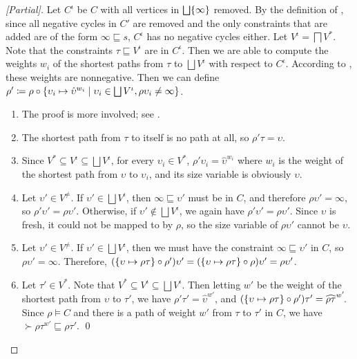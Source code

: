 \begin{proof}[{[Partial]}]
Let $C^\iota$ be $C$ with all vertices in $\bigsqcup \{\infty\}$ removed.
By the definition of \RecCheck, since all negative cycles in $C'$ are removed and the only constraints that are added are of the form $\infty \sqsubseteq s$,
$C^\iota$ has no negative cycles either.
Let $V^\iota = \bigsqcap V^*$.
Note that the constraints $\tau \sqsubseteq V^\iota$ are in $C^\iota$.
Then we are able to compute the weights $w_i$ of the shortest paths from $\tau$ to $\bigsqcup V^\iota$ with respect to $C^\iota$.
According to \citet{f-hat}, these weights are nonnegative.
Then we can define $\rho' \coloneqq \rho \circ \{\upsilon_i \mapsto \hat{\upsilon}^{w_i} \mid \upsilon_i \in \bigsqcup V^\iota, \rho\upsilon_i \neq \infty\}$.

\begin{enumerate}
  \item The proof is more involved; see \citet{f-hat}.
  \item The shortest path from $\tau$ to itself is no path at all, so $\rho'\tau = \upsilon$.
  \item Since $V^* \subseteq V^\iota \subseteq \bigsqcup V^\iota$,
    for every $\upsilon_i \in V^*$, $\rho'\upsilon_i = \hat{\upsilon}^{w_i}$ where $w_i$ is the weight of the shortest path from $\upsilon$ to $\upsilon_i$,
    and its size variable is obviously $\upsilon$.
  \item Let $\upsilon' \in V^\neq$.
    If $\upsilon' \in \bigsqcup V^\iota$, then $\infty \sqsubseteq \upsilon'$ must be in $C$, and therefore $\rho\upsilon' = \infty$, so $\rho'\upsilon' = \rho\upsilon'$.
    Otherwise, if $\upsilon' \notin \bigsqcup V^\iota$, we again have $\rho'\upsilon' = \rho\upsilon'$.
    Since $\upsilon$ is fresh, it could not be mapped to by $\rho$, so the size variable of $\rho\upsilon'$ cannot be $\upsilon$.
  \item Let $\upsilon' \in V^\neq$.
    If $\upsilon' \in \bigsqcup V^\iota$,
    then we must have the constraint $\infty \sqsubseteq \upsilon'$ in $C$, so $\rho\upsilon' = \infty$.
    Therefore, $(\{\upsilon \mapsto \rho\tau\} \circ \rho')\upsilon' = (\{\upsilon \mapsto \rho\tau\} \circ \rho)\upsilon' = \rho\upsilon'$.
  \item Let $\tau' \in V^*$. Note that $V^* \subseteq V^\iota \subseteq \bigsqcup V^\iota$.
    Then letting $w'$ be the weight of the shortest path from $\upsilon$ to $\tau'$, we have $\rho'\tau' = \hat{\upsilon}^{w'}$,
    and $(\{\upsilon \mapsto \rho\tau\} \circ \rho')\tau' = \widehat{\rho\tau}^{w'}\!$.
    Since $\rho \vDash C$ and there is a path of weight $w'$ from $\tau$ to $\tau'$ in $C$,
    we have $\succ{\rho\tau}^{w'}\! \sqsubseteq \rho\tau'$. \qed
\end{enumerate}
\end{proof}

